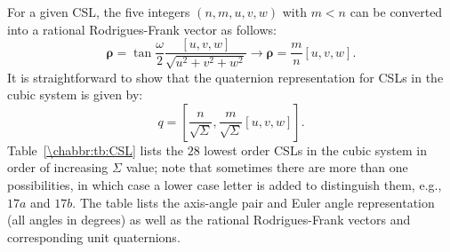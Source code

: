 For a given CSL, the five integers $(n,m,u,v,w)$ with $m<n$ can be converted into a rational Rodrigues-Frank vector  as follows:
\begin{equation}
	\bm{\rho} = \tan\frac{\omega}{2} \frac{[u,v,w]}{\sqrt{u^2+v^2+w^2}} \rightarrow \bm{\rho} = \frac{m}{n}[u,v,w].\label{\chabbr:eq:rhoCSL}
\end{equation}
It is straightforward to show that the quaternion representation for CSLs in the cubic system is given by:
\begin{equation}
	q = \left[\frac{n}{\sqrt{\Sigma}}, \frac{m}{\sqrt{\Sigma}}[u,v,w]\right].\label{\chabbr:eq:qCSL}
\end{equation}
Table~\ref{\chabbr:tb:CSL} lists the $28$ lowest order CSLs in the cubic system in order of increasing $\Sigma$ value; note that sometimes there are more than one possibilities, in which case a lower case letter is added to distinguish them, e.g., $17a$ and $17b$.  The table lists the axis-angle pair and Euler angle representation (all angles in degrees) as well as the rational Rodrigues-Frank vectors and corresponding unit quaternions.


